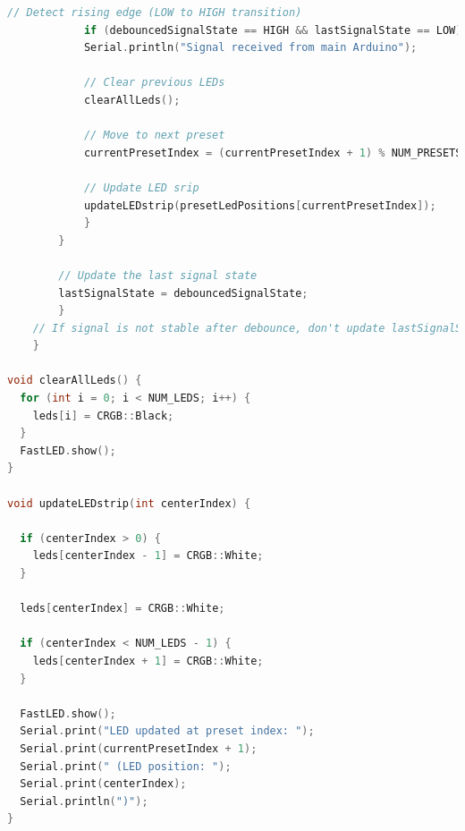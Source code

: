 \begin{lstlisting}[style=cstyle, caption=Cpp Code of the RGB strip with Manual 5 locations, label=lst:RGBcodeManual, language=c++ ]
            // Detect rising edge (LOW to HIGH transition)
            if (debouncedSignalState == HIGH && lastSignalState == LOW) {
            Serial.println("Signal received from main Arduino");
            
            // Clear previous LEDs
            clearAllLeds();
            
            // Move to next preset
            currentPresetIndex = (currentPresetIndex + 1) % NUM_PRESETS;
            
            // Update LED srip
            updateLEDstrip(presetLedPositions[currentPresetIndex]);
            }
        }

        // Update the last signal state
        lastSignalState = debouncedSignalState;
        }
    // If signal is not stable after debounce, don't update lastSignalState
    }

void clearAllLeds() {
  for (int i = 0; i < NUM_LEDS; i++) {
    leds[i] = CRGB::Black;
  }
  FastLED.show();
}

void updateLEDstrip(int centerIndex) {
  
  if (centerIndex > 0) {
    leds[centerIndex - 1] = CRGB::White;
  }
  
  leds[centerIndex] = CRGB::White;
  
  if (centerIndex < NUM_LEDS - 1) {
    leds[centerIndex + 1] = CRGB::White;
  }
  
  FastLED.show();
  Serial.print("LED updated at preset index: ");
  Serial.print(currentPresetIndex + 1); 
  Serial.print(" (LED position: ");
  Serial.print(centerIndex);
  Serial.println(")");
}
\end{lstlisting}


 
